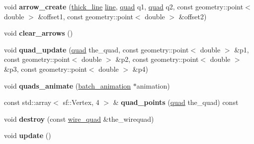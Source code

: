\begin{DoxyCompactItemize}
\item 
\hypertarget{classophidian_1_1gui_1_1canvas_a54ca2400f80f1a1d0fa40c11736795e3}{void {\bfseries arrow\-\_\-create} (\hyperlink{structophidian_1_1gui_1_1thick__line}{thick\-\_\-line} \hyperlink{structophidian_1_1gui_1_1line}{line}, \hyperlink{structophidian_1_1gui_1_1quad}{quad} q1, \hyperlink{structophidian_1_1gui_1_1quad}{quad} q2, const geometry\-::point$<$ double $>$ \&offset1, const geometry\-::point$<$ double $>$ \&offset2)}\label{classophidian_1_1gui_1_1canvas_a54ca2400f80f1a1d0fa40c11736795e3}

\item 
\hypertarget{classophidian_1_1gui_1_1canvas_af87ee5461fcb3116b609af517ca586a2}{void {\bfseries clear\-\_\-arrows} ()}\label{classophidian_1_1gui_1_1canvas_af87ee5461fcb3116b609af517ca586a2}

\item 
\hypertarget{classophidian_1_1gui_1_1canvas_a8baac2b9ecd1538bfe343665a014739f}{void {\bfseries quad\-\_\-update} (\hyperlink{structophidian_1_1gui_1_1quad}{quad} the\-\_\-quad, const geometry\-::point$<$ double $>$ \&p1, const geometry\-::point$<$ double $>$ \&p2, const geometry\-::point$<$ double $>$ \&p3, const geometry\-::point$<$ double $>$ \&p4)}\label{classophidian_1_1gui_1_1canvas_a8baac2b9ecd1538bfe343665a014739f}

\item 
\hypertarget{classophidian_1_1gui_1_1canvas_a6626a669f458029e45251a463723602a}{void {\bfseries quads\-\_\-animate} (\hyperlink{classophidian_1_1gui_1_1batch__animation}{batch\-\_\-animation} $\ast$animation)}\label{classophidian_1_1gui_1_1canvas_a6626a669f458029e45251a463723602a}

\item 
\hypertarget{classophidian_1_1gui_1_1canvas_aad6eaa8fa2ff92ef45a31aa68d8a9d8e}{const std\-::array$<$ sf\-::\-Vertex, 4 $>$ \& {\bfseries quad\-\_\-points} (\hyperlink{structophidian_1_1gui_1_1quad}{quad} the\-\_\-quad) const }\label{classophidian_1_1gui_1_1canvas_aad6eaa8fa2ff92ef45a31aa68d8a9d8e}

\item 
\hypertarget{classophidian_1_1gui_1_1canvas_a849800f115b43f8ae3601cc55ab0a16b}{void {\bfseries destroy} (const \hyperlink{structophidian_1_1gui_1_1wire__quad}{wire\-\_\-quad} \&the\-\_\-wirequad)}\label{classophidian_1_1gui_1_1canvas_a849800f115b43f8ae3601cc55ab0a16b}

\item 
\hypertarget{classophidian_1_1gui_1_1canvas_a346f712c1a516c0311adf2c4f86ed22b}{void {\bfseries update} ()}\label{classophidian_1_1gui_1_1canvas_a346f712c1a516c0311adf2c4f86ed22b}


\end{DoxyCompactItemize}
